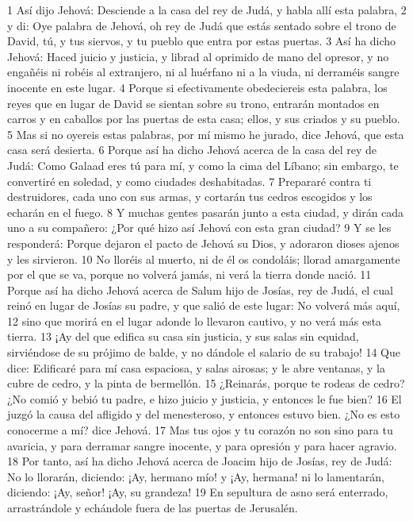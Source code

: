 1 Así dijo Jehová: Desciende a la casa del rey de Judá, y habla allí esta palabra,
2 y di: Oye palabra de Jehová, oh rey de Judá que estás sentado sobre el trono de David, tú, y tus siervos, y tu pueblo que entra por estas puertas.
3 Así ha dicho Jehová: Haced juicio y justicia, y librad al oprimido de mano del opresor, y no engañéis ni robéis al extranjero, ni al huérfano ni a la viuda, ni derraméis sangre inocente en este lugar.
4 Porque si efectivamente obedeciereis esta palabra, los reyes que en lugar de David se sientan sobre su trono, entrarán montados en carros y en caballos por las puertas de esta casa; ellos, y sus criados y su pueblo.
5 Mas si no oyereis estas palabras, por mí mismo he jurado, dice Jehová, que esta casa será desierta.
6 Porque así ha dicho Jehová acerca de la casa del rey de Judá: Como Galaad eres tú para mí, y como la cima del Líbano; sin embargo, te convertiré en soledad, y como ciudades deshabitadas.
7 Prepararé contra ti destruidores, cada uno con sus armas, y cortarán tus cedros escogidos y los echarán en el fuego.
8 Y muchas gentes pasarán junto a esta ciudad, y dirán cada uno a su compañero: ¿Por qué hizo así Jehová con esta gran ciudad?
9 Y se les responderá: Porque dejaron el pacto de Jehová su Dios, y adoraron dioses ajenos y les sirvieron.
10 No lloréis al muerto, ni de él os condoláis; llorad amargamente por el que se va, porque no volverá jamás, ni verá la tierra donde nació.
11 Porque así ha dicho Jehová acerca de Salum hijo de Josías, rey de Judá, el cual reinó en lugar de Josías su padre, y que salió de este lugar: No volverá más aquí,
12 sino que morirá en el lugar adonde lo llevaron cautivo, y no verá más esta tierra.
13 ¡Ay del que edifica su casa sin justicia, y sus salas sin equidad, sirviéndose de su prójimo de balde, y no dándole el salario de su trabajo!
14 Que dice: Edificaré para mí casa espaciosa, y salas airosas; y le abre ventanas, y la cubre de cedro, y la pinta de bermellón. 
15 ¿Reinarás, porque te rodeas de cedro? ¿No comió y bebió tu padre, e hizo juicio y justicia, y entonces le fue bien?
16 El juzgó la causa del afligido y del menesteroso, y entonces estuvo bien. ¿No es esto conocerme a mí? dice Jehová.
17 Mas tus ojos y tu corazón no son sino para tu avaricia, y para derramar sangre inocente, y para opresión y para hacer agravio.
18 Por tanto, así ha dicho Jehová acerca de Joacim hijo de Josías, rey de Judá: No lo llorarán, diciendo: ¡Ay, hermano mío! y ¡Ay, hermana! ni lo lamentarán, diciendo: ¡Ay, señor! ¡Ay, su grandeza!
19 En sepultura de asno será enterrado, arrastrándole y echándole fuera de las puertas de Jerusalén.
